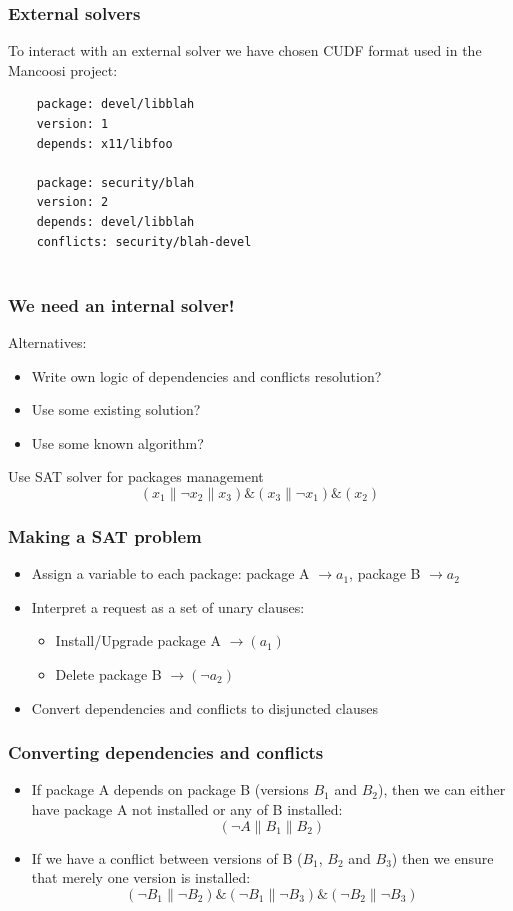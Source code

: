 \documentclass{beamer}
\begin{document}
\begin{frame}[fragile]
\frametitle{External solvers}
To interact with an external solver we have chosen CUDF format used in the
Mancoosi project:
\bigskip
{\small
	\begin{verbatim}
	package: devel/libblah
	version: 1
	depends: x11/libfoo

	package: security/blah
	version: 2
	depends: devel/libblah
	conflicts: security/blah-devel
	
	\end{verbatim}
}
\end{frame}

\begin{frame}
\frametitle{We need an internal solver!}

Alternatives:
\begin{itemize}
  \item Write own logic of dependencies and conflicts resolution?
  \pause
  \item Use some existing solution?
  \pause
  \item Use some known algorithm?
  \pause
\end{itemize}
\bigskip
{\large Use SAT solver for packages management}
\bigskip
\[(x_1 \| \neg x_2 \| x_3) \& (x_3 \| \neg x_1) \& (x_2)\]
\end{frame}

\begin{frame}
\frametitle{Making a SAT problem}
\begin{itemize}
  \item Assign a variable to each package: 
  package A $\to a_1$, package B $\to a_2$
  \item Interpret a request as a set of unary clauses:
  \begin{itemize}
    \item Install/Upgrade package A $\to (a_1)$
    \item Delete package B $\to (\neg a_2)$
  \end{itemize}
  \item Convert dependencies and conflicts to disjuncted clauses
\end{itemize}

\end{frame}

\begin{frame}
\frametitle{Converting dependencies and conflicts}
\begin{itemize}
  \item If package A depends on package B (versions $B_1$ and $B_2$), then we
  can either have package A not installed or any of B installed:
  \bigskip
\[(\neg A \| B_1 \| B_2)\]
\pause
  \item If we have a conflict between versions of B ($B_1$, $B_2$ and $B_3$)
 then we ensure that merely one version is installed:
  \bigskip
\[(\neg B_1 \| \neg B_2) \& (\neg B_1 \| \neg B_3) \& (\neg B_2 \| \neg
B_3)\]
\end{itemize}
\end{frame}
\end{document}
